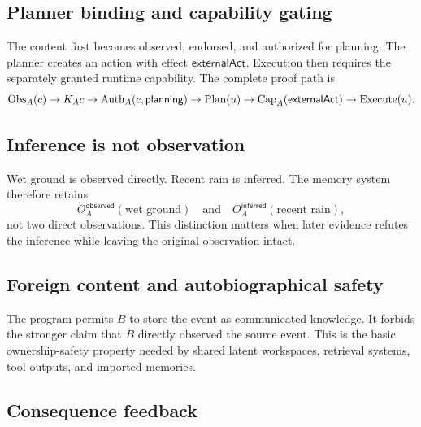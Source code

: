 \subsection{Planner binding and capability gating}



The content first becomes observed, endorsed, and authorized for planning.  The
planner creates an action with effect \(\mathsf{externalAct}\).  Execution then
requires the separately granted runtime capability.  The complete proof path is
\[
\operatorname{Obs}_A(c)
\to K_Ac
\to\operatorname{Auth}_A(c,\mathsf{planning})
\to\operatorname{Plan}(u)
\to\operatorname{Cap}_A(\mathsf{externalAct})
\to\operatorname{Execute}(u).
\]

\subsection{Inference is not observation}



Wet ground is observed directly.  Recent rain is inferred.  The memory system
therefore retains
\[
O_A^{\mathsf{observed}}(\text{wet ground})
\quad\text{and}\quad
O_A^{\mathsf{inferred}}(\text{recent rain}),
\]
not two direct observations.  This distinction matters when later evidence
refutes the inference while leaving the original observation intact.

\subsection{Foreign content and autobiographical safety}



The program permits \(B\) to store the event as communicated knowledge.  It
forbids the stronger claim that \(B\) directly observed the source event.  This
is the basic ownership-safety property needed by shared latent workspaces,
retrieval systems, tool outputs, and imported memories.

\subsection{Consequence feedback}

